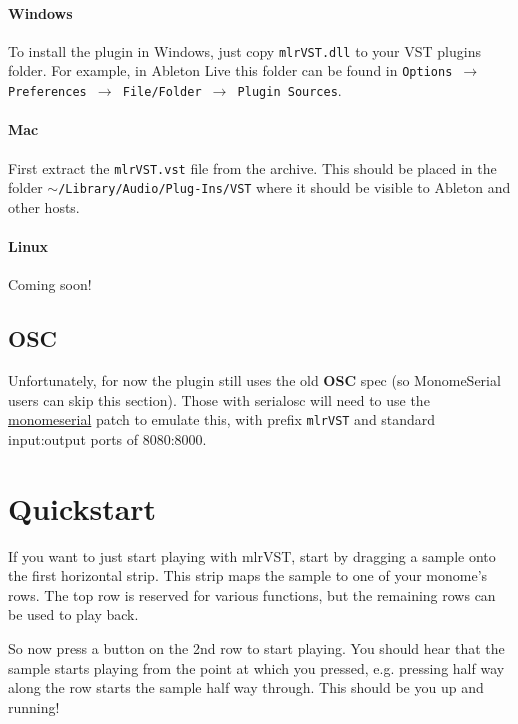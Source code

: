 \documentclass[10pt,a4paper]{report}
\begin{document}
\paragraph{Windows}

To install the plugin in Windows, just copy \texttt{mlrVST.dll} to your VST plugins folder. For example, in Ableton Live this folder can be found in \texttt{Options $\rightarrow$ Preferences $\rightarrow$ File/Folder $\rightarrow$ Plugin Sources}.

\paragraph{Mac}

First extract the \texttt{mlrVST.vst} file from the archive. This should be placed in the folder \texttt{$\sim$/Library/Audio/Plug-Ins/VST} where it should be visible to Ableton and other hosts.

\paragraph{Linux}

Coming soon!

\subsection{OSC}

Unfortunately, for now the plugin still uses the old \textbf{OSC} spec (so MonomeSerial users can skip this section). Those with serialosc will need to use the \href{http://docs.monome.org/doku.php?id=app:monomepseudorial}{monomeserial} patch to emulate this, with prefix \texttt{mlrVST} and standard input:output ports of 8080:8000.

\section{Quickstart}

If you want to just start playing with mlrVST, start by dragging a sample onto the first horizontal strip. This strip maps the sample to one of your monome's rows. The top row is reserved for various functions, but the remaining rows can be used to play back.

So now press a button on the 2nd row to start playing. You should hear that the sample starts playing from the point at which you pressed, e.g. pressing half way along the row starts the sample half way through. This should be you up and running!
\end{document}
